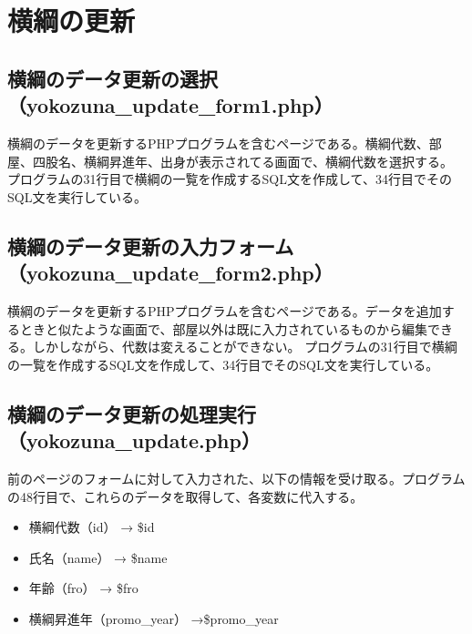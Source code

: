 \documentclass[10pt,a4paper,titlepage]{jreport}
\begin{document}
\section{横綱の更新}


\subsection{横綱のデータ更新の選択（yokozuna\_update\_form1.php）}

横綱のデータを更新するPHPプログラムを含むページである。横綱代数、部屋、四股名、横綱昇進年、出身が表示されてる画面で、横綱代数を選択する。
プログラムの31行目で横綱の一覧を作成するSQL文を作成して、34行目でそのSQL文を実行している。\\




\subsection{横綱のデータ更新の入力フォーム（yokozuna\_update\_form2.php）}

横綱のデータを更新するPHPプログラムを含むページである。データを追加するときと似たような画面で、部屋以外は既に入力されているものから編集できる。しかしながら、代数は変えることができない。
プログラムの31行目で横綱の一覧を作成するSQL文を作成して、34行目でそのSQL文を実行している。\\




\subsection{横綱のデータ更新の処理実行（yokozuna\_update.php）}

前のページのフォームに対して入力された、以下の情報を受け取る。プログラムの48行目で、これらのデータを取得して、各変数に代入する。



\begin{itemize}
	\item 横綱代数（id） → \$id
	\item 氏名（name） → \$name
	\item 年齢（fro） → \$fro
	\item 横綱昇進年（promo\_year） →\$promo\_year
	\end{itemize}
\end{document}
